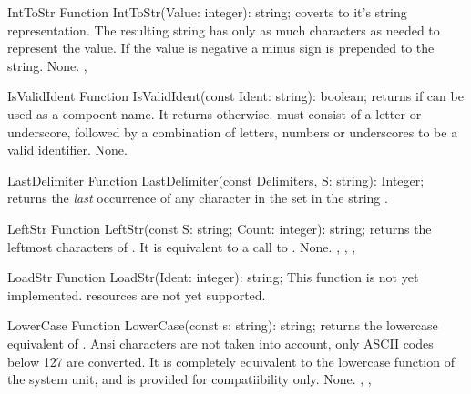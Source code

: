 

\begin{function}{IntToStr}
\Declaration
Function IntToStr(Value: integer): string;
\Description
{} coverts  to it's string representation.
The resulting string has only as much characters as needed to represent
the value. If the value is negative a minus sign is prepended to the
string.
\Errors
None.
\SeeAlso
{}, 
\end{function}



\begin{function}{IsValidIdent}
\Declaration
Function IsValidIdent(const Ident: string): boolean;
\Description
{} returns  if  can be used as a
compoent name. It returns  otherwise.  must consist of
a letter or underscore, followed by a combination of letters, numbers or
underscores to be a valid identifier.
\Errors
None.
\SeeAlso
\end{function}



\begin{function}{LastDelimiter}
\Declaration
Function LastDelimiter(const Delimiters, S: string): Integer;
\Description
{} returns the {\em last} occurrence of any character in
the set  in the string .
\Errors
\SeeAlso
\end{function}



\begin{function}{LeftStr}
\Declaration
Function LeftStr(const S: string; Count: integer): string;
\Description
{} returns the  leftmost characters of .
It is equivalent to a call to .
\Errors
None.
\SeeAlso
{}, , , 
\end{function}



\begin{function}{LoadStr}
\Declaration
Function LoadStr(Ident: integer): string;
\Description
This function is not yet implemented. resources are not yet supported.
\Errors
\SeeAlso
\end{function}

\begin{function}{LowerCase}
\Declaration
Function LowerCase(const s: string): string;
\Description
{} returns the lowercase equivalent of . Ansi characters
are not taken into account, only ASCII codes below 127 are converted. It is
completely equivalent to the lowercase function of the system unit, and is
provided for compatiibility only.
\Errors
None.
\SeeAlso
{}, , 
\end{function}

